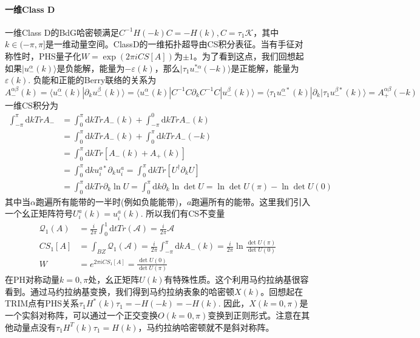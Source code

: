 \documentclass[a4paper]{article}
\numberwithin{equation}{subsection}
\begin{document}
\paragraph{一维Class D}
一维Class D的BdG哈密顿满足$C^{-1}H(-k)C=-H(k),C=\tau_1\mathcal{K}$，其中$k\in(-\pi,\pi]$是一维动量空间。ClassD的一维拓扑超导由CS积分表征。当有手征对称性时，PHS量子化$W=\exp(2\pi iCS[A])$为$\pm 1$。为了看到这点，我们回想起如果$|u_-^\alpha(k)\rangle$是负能解，能量为$-\varepsilon(k)$，那么$|\tau_1u^{*\alpha}_-(-k)\rangle$是正能解，能量为$\varepsilon(k)$. 负能和正能的Berry联络的关系为
\begin{equation}
    A_-^{\alpha\beta}(k)=\langle u_-^\alpha(k)|\partial_k u_-^\beta(k)\rangle=\langle u_-^\alpha(k)|C^{-1}C\partial_k C^{-1}C|u_-^\beta(k)\rangle=\langle \tau_1u_-^{\alpha*}(k)|\partial_k|\tau_1u_-^{\beta*}(k)\rangle=A_+^{\alpha\beta}(-k)
\end{equation}
一维CS积分为
\begin{equation}
    \begin{split}
        \int_{-\pi}^{\pi}\mathrm{d}kTrA_-&=\int_{0}^\pi\mathrm{d}kTrA_-(k)+\int_{-\pi}^0\mathrm{d}kTrA_-(k)\\
        &=\int_0^\pi\mathrm{d}kTrA_-(k)+\int_{0}^\pi\mathrm{d}kTrA_-(-k)\\
        &=\int_0^\pi\mathrm{d}kTr[A_-(k)+A_+(k)]\\
        &=\int_0^\pi\mathrm{d}ku_i^{a*}\partial_k u_i^{a}=\int_0^\pi\mathrm{d}kTr[U^\dagger\partial_kU]\\
        &=\int_0^\pi\mathrm{d}kTr\partial_k\ln U=\int_0^\pi\mathrm{d}k\partial_k\ln\det U=\ln\det U(\pi)-\ln\det U(0)
    \end{split}
\end{equation}
其中当$\alpha$跑遍所有能带的一半时(例如负能能带)，$a$跑遍所有的能带。这里我们引入一个幺正矩阵符号$U_i^a(k)=u_i^a(k)$. 所以我们有CS不变量
\begin{equation}
    \begin{split}
        \mathcal{Q}_1(A)&=\frac{i}{2\pi}\int_0^1\mathrm{d}tTr(\mathcal{A})=\frac{i}{2\pi}\mathcal{A}\\
        CS_1[A]&=\int_{BZ}\mathcal{Q}_1(\mathcal{A})=\frac{i}{2\pi}\int_{-\pi}^{\pi}\mathrm{d}kA_-(k)=\frac{i}{2\pi}\ln\frac{\det U(\pi)}{\det U(0)}\\
        W&=e^{2\pi iCS_1[A]}=\frac{\det U(0)}{\det U(\pi)}
    \end{split}
\end{equation}
在PH对称动量$k=0,\pi$处，幺正矩阵$U(k)$有特殊性质。这个利用马约拉纳基很容看到。通过马约拉纳基变换，我们得到马约拉纳表象的哈密顿$X(k)$。回想起在TRIM点有PHS关系$\tau_1H^*(k)\tau_1=-H(-k)=-H(k)$. 因此，$X(k=0,\pi)$是一个实斜对称阵，可以通过一个正交变换$O(k=0,\pi)$变换到正则形式。注意在其他动量点没有$\tau_1H^T(k)\tau_1=H(k)$，马约拉纳哈密顿就不是斜对称阵。
\end{document}
